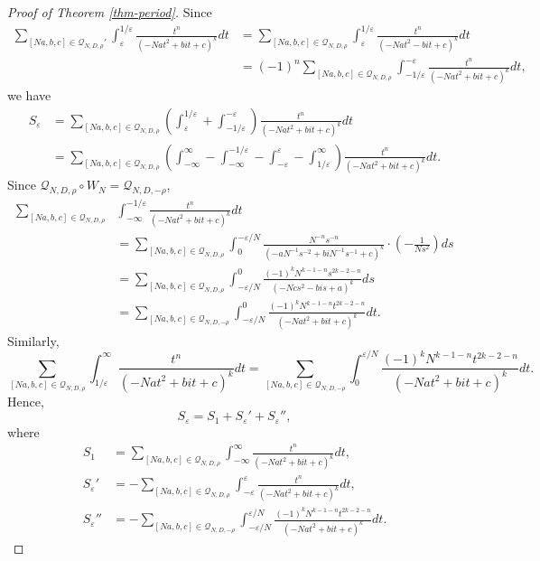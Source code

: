 \documentclass[12pt]{amsart}
\numberwithin{equation}{section}
\theoremstyle{definition}
\begin{document}
\begin{proof}[Proof of Theorem \ref{thm-period}]
Since
\begin{align*}
    \sum_{[Na,b,c]\in\mathcal{Q}_{N,D,\rho}'}\int_{\varepsilon}^{1/\varepsilon}\frac{t^{n}}{(-Nat^{2}+bit+c)^{k}}dt&=\sum_{[Na,b,c]\in\mathcal{Q}_{N,D,\rho}}\int_{\varepsilon}^{1/\varepsilon}\frac{t^{n}}{(-Nat^{2}-bit+c)^{k}}dt\\
    &=(-1)^{n}\sum_{[Na,b,c]\in\mathcal{Q}_{N,D,\rho}}\int_{-1/\varepsilon}^{-\varepsilon}\frac{t^{n}}{(-Nat^{2}+bit+c)^{k}}dt,
\end{align*}
we have
\begin{align*}
    S_{\varepsilon}&=\sum_{[Na,b,c]\in\mathcal{Q}_{N,D,\rho}}\left(\int_{\varepsilon}^{1/\varepsilon}+\int_{-1/\varepsilon}^{-\varepsilon}\right)\frac{t^{n}}{(-Nat^{2}+bit+c)^{k}}dt\\
    &=\sum_{[Na,b,c]\in\mathcal{Q}_{N,D,\rho}}\left(\int_{-\infty}^{\infty}-\int_{-\infty}^{-1/\varepsilon}-\int_{-\varepsilon}^{\varepsilon}-\int_{1/\varepsilon}^{\infty}\right)\frac{t^{n}}{(-Nat^{2}+bit+c)^{k}}dt.
\end{align*}
Since $\mathcal{Q}_{N,D,\rho}\circ W_{N}=\mathcal{Q}_{N,D,-\rho}$,
\begin{align*}
    \sum_{[Na,b,c]\in\mathcal{Q}_{N,D,\rho}}&\int_{-\infty}^{-1/\varepsilon}\frac{t^{n}}{(-Nat^{2}+bit+c)^{k}}dt\\
    &=\sum_{[Na,b,c]\in\mathcal{Q}_{N,D,\rho}}\int_{0}^{-\varepsilon/N}\frac{N^{-n}s^{-n}}{(-aN^{-1}s^{-2}+biN^{-1}s^{-1}+c)^{k}}\cdot\left(-\frac{1}{Ns^{2}}\right)ds\\
    &=\sum_{[Na,b,c]\in\mathcal{Q}_{N,D,\rho}}\int_{-\varepsilon/N}^{0}\frac{(-1)^{k}N^{k-1-n}s^{2k-2-n}}{(-Ncs^{2}-bis+a)^{k}}ds\\
    &=\sum_{[Na,b,c]\in\mathcal{Q}_{N,D,-\rho}}\int_{-\varepsilon/N}^{0}\frac{(-1)^{k}N^{k-1-n}t^{2k-2-n}}{(-Nat^{2}+bit+c)^{k}}dt.
\end{align*}
Similarly,
$$\sum_{[Na,b,c]\in\mathcal{Q}_{N,D,\rho}}\int_{1/\varepsilon}^{\infty}\frac{t^{n}}{(-Nat^{2}+bit+c)^{k}}dt=\sum_{[Na,b,c]\in\mathcal{Q}_{N,D,-\rho}}\int_{0}^{\varepsilon/N}\frac{(-1)^{k}N^{k-1-n}t^{2k-2-n}}{(-Nat^{2}+bit+c)^{k}}dt.$$
Hence,
$$S_{\varepsilon}=S_{1}+S_{\varepsilon}'+S_{\varepsilon}'',$$
where
\begin{align*}
    S_{1}&=\sum_{[Na,b,c]\in\mathcal{Q}_{N,D,\rho}}\int_{-\infty}^{\infty}\frac{t^{n}}{(-Nat^{2}+bit+c)^{k}}dt,\\
    S_{\varepsilon}'&=-\sum_{[Na,b,c]\in\mathcal{Q}_{N,D,\rho}}\int_{-\varepsilon}^{\varepsilon}\frac{t^{n}}{(-Nat^{2}+bit+c)^{k}}dt,\\
    S_{\varepsilon}''&=-\sum_{[Na,b,c]\in\mathcal{Q}_{N,D,-\rho}}\int_{-\varepsilon/N}^{\varepsilon/N}\frac{(-1)^{k}N^{k-1-n}t^{2k-2-n}}{(-Nat^{2}+bit+c)^{k}}dt.
\end{align*}


\end{proof}
\end{document}
